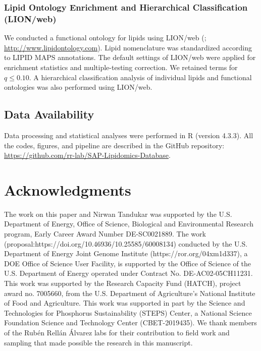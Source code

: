 \documentclass[9pt,twocolumn,twoside]{rilabRxiv}
\begin{document}
\subsubsection*{Lipid Ontology Enrichment and Hierarchical Classification (LION/web)}

We conducted a functional ontology for lipids using LION/web (\cite{Molenaar2019}; \url{http://www.lipidontology.com}). Lipid nomenclature was standardized according to LIPID MAPS annotations. The default settings of LION/web were applied for enrichment statistics and multiple-testing correction. We retained terms for $q \leq 0.10$. A hierarchical classification analysis of individual lipids and functional ontologies was also performed using LION/web.


\subsection*{Data Availability}

Data processing and statistical analyses were performed in R (version 4.3.3). All the codes, figures, and pipeline are described in the GitHub repository: \url{https://github.com/rr-lab/SAP-Lipidomics-Database}.
 

\section{Acknowledgments}
The work on this paper and Nirwan Tandukar was supported by the U.S. Department of Energy, Office of Science, Biological and Environmental Research program, Early Career Award Number DE-SC0021889.
The work (proposal:https://doi.org/10.46936/10.25585/60008134) conducted by the U.S. Department of Energy Joint Genome Institute (https://ror.org/04xm1d337), a DOE Office of Science User Facility, is supported by the Office of Science of the U.S. Department of Energy operated under Contract No. DE-AC02-05CH11231. This work was supported by the Research Capacity Fund (HATCH), project award no. 7005660, from the U.S. Department of Agriculture’s National Institute of Food and Agriculture.  
This work was supported in part by the Science and Technologies for Phosphorus Sustainability (STEPS) Center, a National Science Foundation Science and Technology Center (CBET-2019435).
We thank members of the Rubén Rellán Álvarez labs for their contribution to field work and sampling that made possible the research in this manuscript.




\pagebreak
\end{document}
